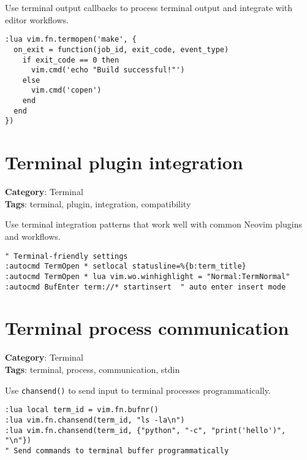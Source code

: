 {{{{{{{{{{Use terminal output callbacks to process terminal output and integrate with editor workflows.

\begin{Exa*}{}
\begin{Verbatim}[fontsize=\footnotesize, breaklines, breakanywhere]
:lua vim.fn.termopen('make', {
  on_exit = function(job_id, exit_code, event_type)
    if exit_code == 0 then 
      vim.cmd('echo "Build successful!"')
    else
      vim.cmd('copen')
    end
  end
})
\end{Verbatim}
\end{Exa*}

\section{Terminal plugin integration}

\textbf{Category}: Terminal\\ \textbf{Tags}: terminal, plugin, integration, compatibility
\vspace{0.5cm}

Use terminal integration patterns that work well with common Neovim plugins and workflows.

\begin{Exa*}{}
\begin{Verbatim}[fontsize=\footnotesize, breaklines, breakanywhere]
" Terminal-friendly settings
:autocmd TermOpen * setlocal statusline=%{b:term_title}
:autocmd TermOpen * lua vim.wo.winhighlight = "Normal:TermNormal"
:autocmd BufEnter term://* startinsert  " auto enter insert mode
\end{Verbatim}
\end{Exa*}

\section{Terminal process communication}

\textbf{Category}: Terminal\\ \textbf{Tags}: terminal, process, communication, stdin
\vspace{0.5cm}

Use {\footnotesize \Verb§chansend()§} to send input to terminal processes programmatically.

\begin{Exa*}{}
\begin{Verbatim}[fontsize=\footnotesize, breaklines, breakanywhere]
:lua local term_id = vim.fn.bufnr()
:lua vim.fn.chansend(term_id, "ls -la\n")
:lua vim.fn.chansend(term_id, {"python", "-c", "print('hello')", "\n"})
" Send commands to terminal buffer programmatically
\end{Verbatim}
\end{Exa*}

}}}}}}}}}}
